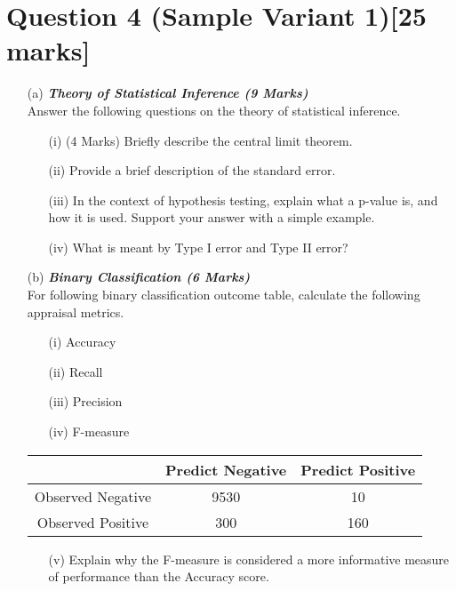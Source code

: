 \documentclass[]{article}
\begin{document}
\section*{Question 4 (Sample Variant 1)[25 marks]}

\begin{itemize}
\item[(a)]
 \textbf{\textit{Theory of Statistical Inference  (9 Marks)}}\\ Answer the following questions on the theory of statistical inference.
\begin{itemize}
\item[(i)] (4 Marks) Briefly describe the central limit theorem.
\item[(ii)]  Provide a brief description of the standard error.
\item[(iii)]  In the context of hypothesis testing, explain what a p-value is, and how it is used. Support your answer with a simple example.
\item[(iv)]  What is meant by Type I error and Type II error?
\end{itemize}


\item[(b)] \textbf{\textit{Binary Classification (6 Marks)}}\\
For following binary classification outcome table, calculate the following appraisal metrics.
\begin{itemize}
\item[(i)] Accuracy
\item[(ii)] Recall
\item[(iii)] Precision
\item[(iv)] F-measure
\end{itemize}

\begin{center}
\begin{tabular}{|c|c|c|}
\hline  & \phantom{spa}Predict Negative\phantom{spa} & \phantom{spa}Predict Positive\phantom{spa} \\ 
\hline\phantom{spa} Observed Negative \phantom{spa}&9530&10\\ 
\hline \phantom{spa}Observed Positive\phantom{spa} & 300&160\\ 
\hline 
\end{tabular} 
\end{center}

\begin{itemize}
\item[(v)]  Explain why the F-measure is considered a more informative measure of performance than the Accuracy score.
\end{itemize}


\end{itemize}
\end{document}

